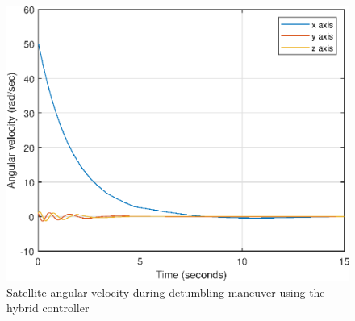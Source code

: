 \begin{figure}[H]
	\centering
	\includegraphics[width=0.5\linewidth]{figures/hybridomega}
	\caption{Satellite angular velocity during detumbling maneuver using the hybrid controller}
	\label{fig:detumblingomega}
\end{figure}



